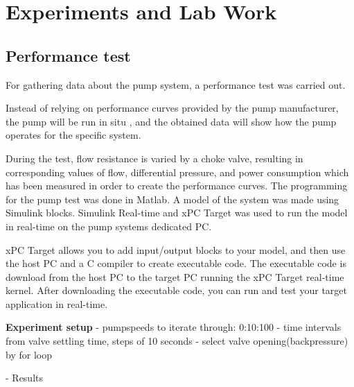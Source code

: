 \chapter{Experiments and Lab Work}\label{ch:experiment} 
\section{Performance test}\label{sec:performance_test} 
For gathering data about the pump system, a performance test was carried out.

Instead of relying on performance curves provided by the pump manufacturer,
the pump will be run in situ , 
and the obtained data will show how the pump operates for the specific system.
 
During the test, flow resistance is varied by a choke valve, resulting in 
corresponding values of flow, differential pressure, and power consumption 
which has been measured in order to create the performance curves.
\newline
\newline
The programming for the pump test was done in Matlab. 
A model of the system was made using Simulink blocks. 
Simulink Real-time and xPC Target was used to run the model in real-time 
on the pump systems dedicated PC. 


xPC Target allows you to add input/output blocks to your model, and then use the host 
PC and a C compiler to create executable code. The executable code is download 
from the host PC to the target PC running the xPC Target real-time kernel. 
After downloading the executable code, you can run and test your target 
application in real-time. 


\textbf{Experiment setup}
- pumpspeeds to iterate through: 0:10:100\n
- time intervals from valve settling time, steps of 10 seconds
- select valve opening(backpressure) by for loop


- Results
 